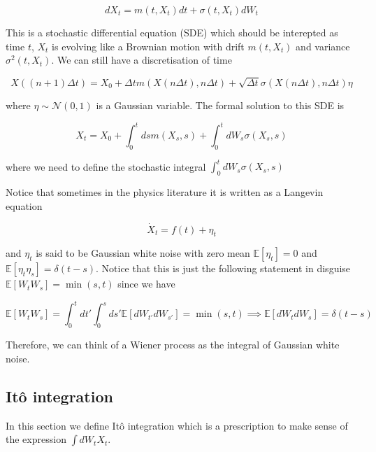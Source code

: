 \documentclass[11pt,a4paper]{article}
\begin{document}
\begin{equation}
    dX_t = m(t,X_t)dt + \sigma(t,X_t)dW_t
\end{equation}

This is a stochastic differential equation (SDE) which should be interepted as time $t$, $X_t$ is evolving like a Brownian motion with drift $m(t, X_t)$ and variance $\sigma^2(t, X_t)$. We can still have a discretisation of time

\begin{equation}
    X((n+1)\Delta t) = X_0 + \Delta t m(X(n \Delta t), n\Delta t) + \sqrt{\Delta t} \sigma(X(n \Delta t), n\Delta t)\eta
\end{equation}

where $\eta \sim \mathcal{N}(0,1)$ is a Gaussian variable. The formal solution to this SDE is

\begin{equation}
    X_t = X_0 + \int_{0}^tds m(X_s,s) + \int_{0}^tdW_s \sigma(X_s,s)
\end{equation}

where we need to define the stochastic integral $\int_{0}^tdW_s \sigma(X_s,s)$


Notice that sometimes in the physics literature it is written as a Langevin equation

\begin{equation}
    \dot{X}_t = f(t) + \eta_t
\end{equation}

and $\eta_t$ is said to be Gaussian white noise with zero mean $\mathbb{E}[\eta_t]=0$ and $\mathbb{E}[\eta_t \eta_s]=\delta(t-s)$. Notice that this is just the following statement in disguise $\mathbb{E}[W_t W_s] = \min(s,t)$ since we have

\begin{equation}
    \mathbb{E}[W_t W_s] = \int_{0}^tdt'\int_{0}^sds'   \mathbb{E}[dW_{t'} dW_{s'}] = \min(s,t) \implies \mathbb{E}[dW_t dW_s] =\delta(t-s) 
\end{equation}

Therefore, we can think of a Wiener process as the integral of Gaussian white noise.


\subsection{It\^{o} integration}

In this section we define It\^{o} integration which is a prescription to make sense of the expression $\int dW_tX_t$.
\end{document}
